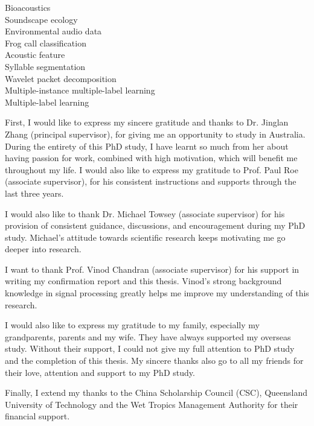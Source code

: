 \begin{keywords}
Bioacoustics \\
Soundscape ecology\\
Environmental audio data \\
Frog call classification \\
Acoustic feature \\
Syllable segmentation\\
Wavelet packet decomposition \\
Multiple-instance multiple-label learning \\
Multiple-label learning \\
 
\end{keywords}






\begin{ack}
First, I would like to express my sincere gratitude and thanks to Dr. Jinglan Zhang (principal supervisor), for giving me an opportunity to study in Australia. During the entirety of this PhD study, I have learnt so much from her about having passion for work, combined with high motivation, which will benefit me throughout my life. 
I would also like to express my gratitude to Prof. Paul Roe (associate supervisor), for his consistent instructions and supports through the last three years.  

I would also like to thank Dr. Michael Towsey (associate supervisor) for his provision of consistent guidance, discussions, and encouragement during my PhD study. Michael's attitude towards scientific research keeps motivating me go deeper into research.  


I want to thank Prof. Vinod Chandran (associate supervisor) for his support in writing my confirmation report and this thesis. Vinod's strong background knowledge in signal processing greatly helps me improve my understanding of this research.

I would also like to express my gratitude to my family, especially my grandparents, parents and my wife. They have always supported my overseas study. Without their support, I could not give my full attention to PhD study and  the completion of this thesis. 
My sincere thanks also go to all my friends for their love, attention and support to my PhD study. 

Finally, I extend my thanks to the China Scholarship Council (CSC), Queensland University of Technology and the Wet Tropics Management Authority for their financial support. 

\end{ack}





\afterpreface

